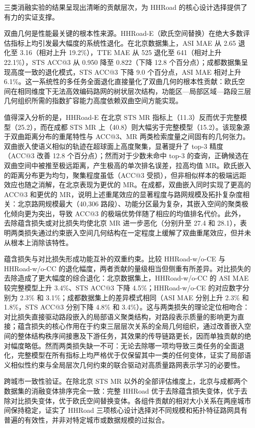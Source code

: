 三类消融实验的结果呈现出清晰的贡献层次，为 HHRoad 的核心设计选择提供了有力的实证支撑。

双曲几何是性能最关键的根本性来源。HHRoad-E（欧氏空间替换）在绝大多数评估指标上均引发最大幅度的系统性退化。在北京数据集上，ASI MAE 从 2.65 退化至 3.16（相对上升 19.2\%），TTE MAE 从 525 退化至 641（相对上升 22.1\%），STS ACC@3 从 0.950 降至 0.822（下降 12.8 个百分点）；成都数据集呈现高度一致的退化模式，STS ACC@3 下降 9.0 个百分点，ASI MAE 相对上升 6.1\%。这一系统性的多任务全面退化直接量化了双曲几何的根本性贡献：欧氏空间在相同维度下无法高效编码路网的树状层次结构，功能区—局部区域—路段三层几何组织所需的指数扩容能力高度依赖双曲空间方能实现。

值得深入分析的是，HHRoad-E 在北京 STS MR 指标上（11.3）反而优于完整模型（25.2），而在成都 STS MR 上（40.8）则大幅劣于完整模型（15.2）。该现象源于双曲距离分布的重尾特性与 ACC@3、MR 两类检索度量之间固有的几何张力。双曲嵌入使语义相似的轨迹在超球面上高度聚集，显著提升了 top-3 精度（ACC@3 改善 12.8 个百分点）；然而对于少数未命中 top-3 的查询，正确候选在双曲空间中被推至极远距离，产生极高的单次排名误差，拉高均值 MR。欧氏嵌入的距离分布更为均匀，聚集程度虽低（ACC@3 受损），但非相似样本的极端远距效应也随之消解，在北京表现为更优的 MR。在成都，双曲嵌入同时实现了更高的 ACC@3 和更优的 MR，说明上述重尾效应的显著程度与路网规模及拓扑复杂度相关：北京路网规模最大（40,306 路段）、功能分区最为复杂，其嵌入空间的聚类极化倾向更为突出，导致 ACC@3 的极端优势伴随了相应的均值排名代价。此外，去除蕴含损失或对比损失均使北京 MR 进一步恶化（分别升至 27.4 和 28.1），表明两类损失通过约束嵌入空间几何结构在一定程度上缓解了双曲重尾效应，但并未从根本上消除该特性。

蕴含损失与对比损失形成功能互补的双重约束。比较 HHRoad-w/o-CE 与 HHRoad-w/o-CC 的退化幅度，两者贡献的量级相当但侧重有所差异。对比损失的去除造成了更大幅度的综合退化：北京数据集上，HHRoad-w/o-CC 的 ASI MAE 较完整模型上升 3.4\%、STS ACC@3 下降 4.5\%；HHRoad-w/o-CE 的对应数字分别为 2.3\% 和 3.1\%；成都数据集上的差异模式相同（ASI MAE 分别上升 2.3\% 和 1.8\%，STS ACC@3 分别下降 4.8\% 和 3.4\%）。这与两类损失的理论定位相吻合：对比损失直接驱动路段嵌入的局部语义聚类结构，对路段表示质量的影响更为直接；蕴含损失的核心作用在于约束三层层次关系的全局几何组织，通过改善嵌入空间的整体结构秩序间接惠及下游任务，其效果的传导链路更长，因而单独贡献的绝对幅度略低。然而两类损失缺一不可：无论去除哪一项均导致三类任务的全面退化，完整模型在所有指标上均严格优于仅保留其中一类的任何变体，证实了局部语义相似性约束与全局层次几何约束的联合驱动对高质量路网表示学习的必要性。

跨城市一致性验证。在除北京 STS MR 以外的全部评估维度上，北京与成都两个数据集的消融变体排序完全一致：完整 HHRoad 优于去除蕴含损失变体，优于去除对比损失变体，优于欧氏空间替换变体。各组件贡献的相对大小关系在两座城市间保持稳定，证实了 HHRoad 三项核心设计选择对不同规模和拓扑特征路网具有普遍的有效性，并非对特定城市或数据规模的过拟合。


